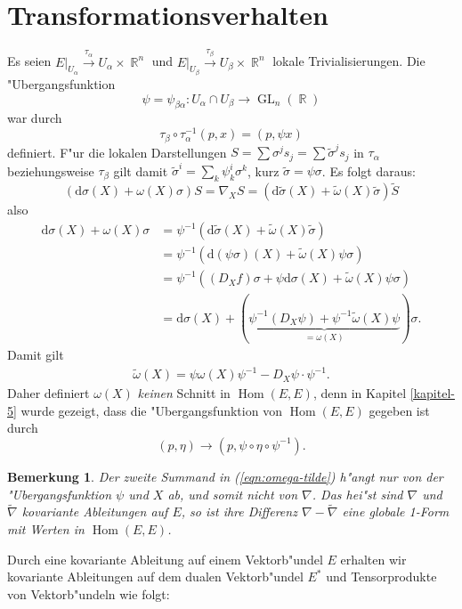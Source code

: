\documentclass[paper=A4, twoside, chapterprefix=true, bibliography=totoc, headsepline]{scrbook}
\DeclareMathOperator{\R}{\mathbb{R}}
\DeclareMathOperator{\GL}{GL}       %
\DeclareMathOperator{\Hom}{Hom}     %
\newcommand{\dop}{\mathrm{d}}
\newcommand{\X}{\times}
\theoremstyle{plain}
\theoremstyle{nonumberplain}
\newtheorem{bem}{Bemerkung}
\theoremstyle{empty}
\theoremstyle{break}
\begin{document}
\section{Transformationsverhalten}

Es seien $E|_{U_\alpha} \overset{\tau_\alpha}{\to} U_\alpha \X \R^n$ und $E|_{U_\beta} \overset{\tau_\beta}{\to} U_{\beta} \X \R^n$ lokale Trivialisierungen. Die "Ubergangsfunktion
\[ \psi = \psi_{\beta\alpha}: U_\alpha \cap U_\beta \to \GL_n(\R) \]
war durch
\[ \tau_\beta \circ \tau_\alpha^{-1} (p,x) = (p, \psi x) \]
definiert.
F"ur die lokalen Darstellungen $S = \sum \sigma^j s_j = \sum \tilde\sigma^j s_j$ in $\tau_\alpha$ beziehungsweise $\tau_\beta$ gilt damit $\tilde\sigma^{i} = \sum_k \psi_k^{i} \sigma^k$, kurz $\tilde\sigma = \psi \sigma$.
Es folgt daraus:
\[ (\dop \sigma(X) + \omega(X) \sigma) S = \nabla_X S = (\dop \tilde\sigma(X) + \tilde\omega(X)\tilde\sigma) \tilde S \]
also
\begin{align*}
  \dop \sigma(X) + \omega(X) \sigma &= \psi^{-1}(\dop \tilde\sigma(X) + \tilde\omega(X) \tilde\sigma)\\
  &= \psi^{-1} (\dop(\psi\sigma)(X) + \tilde\omega(X) \psi \sigma)\\
  &= \psi^{-1} ((D_X f) \sigma + \psi \dop \sigma(X) + \tilde\omega(X) \psi \sigma)\\
  &= \dop \sigma(X) + (\underbrace{\psi^{-1}(D_X \psi) + \psi^{-1} \tilde\omega(X) \psi}_{=\omega(X)}) \sigma.
\end{align*}
Damit gilt
\begin{align}
  \tilde\omega(X) = \psi \omega(X) \psi^{-1} - D_X \psi \cdot \psi^{-1}.\label{eqn:omega-tilde}
\end{align}
Daher definiert $\omega(X)$ \emph{keinen} Schnitt in $\Hom(E, E)$, denn in Kapitel \ref{kapitel-5} wurde gezeigt, dass die "Ubergangsfunktion von $\Hom(E, E)$ gegeben ist durch
\[ (p, \eta) \to (p, \psi \circ \eta \circ \psi^{-1}). \]

\begin{bem}
  Der zweite Summand in (\ref{eqn:omega-tilde}) h"angt \emph{nur} von der "Ubergangsfunktion $\psi$ und $X$ ab, und somit \emph{nicht} von $\nabla$.
  Das hei"st sind $\nabla$ und $\tilde\nabla$ kovariante Ableitungen auf $E$, so ist ihre Differenz $\nabla - \tilde\nabla$ eine globale 1-Form mit Werten in $\Hom(E,E)$.
\end{bem}

Durch eine kovariante Ableitung auf einem Vektorb"undel $E$ erhalten wir kovariante Ableitungen auf dem dualen Vektorb"undel $E^*$ und Tensorprodukte von Vektorb"undeln wie folgt:
\end{document}
